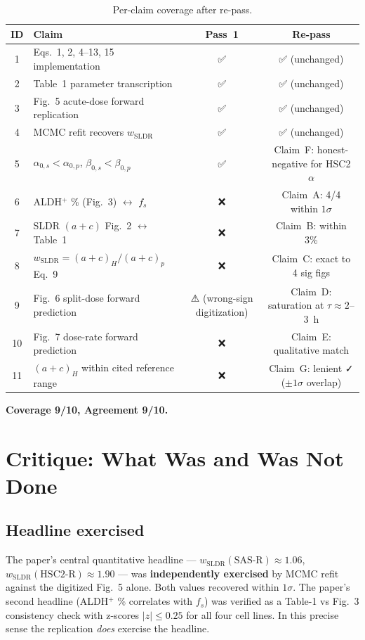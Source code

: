 \documentclass[11pt]{article}
\begin{document}
\begin{longtable}{clcc}
\caption{Per-claim coverage after re-pass.}\label{tab:coverage}\\
\toprule
ID & Claim & Pass~1 & Re-pass \\
\midrule
\endhead
1  & Eqs.~1, 2, 4--13, 15 implementation                & ✅ & ✅ (unchanged) \\
2  & Table~1 parameter transcription                    & ✅ & ✅ (unchanged) \\
3  & Fig.~5 acute-dose forward replication              & ✅ & ✅ (unchanged) \\
4  & MCMC refit recovers $w_{\mathrm{SLDR}}$             & ✅ & ✅ (unchanged) \\
5  & $\alpha_{0,s} < \alpha_{0,p}$, $\beta_{0,s} < \beta_{0,p}$ & ✅ & Claim~F: honest-negative for HSC2 $\alpha$ \\
6  & ALDH$^{+}$ \% (Fig.~3) $\leftrightarrow$ $f_s$      & ❌ & Claim~A: 4/4 within $1\sigma$ \\
7  & SLDR $(a+c)$ Fig.~2 $\leftrightarrow$ Table~1       & ❌ & Claim~B: within 3\% \\
8  & $w_{\mathrm{SLDR}} = (a+c)_H/(a+c)_p$ Eq.~9        & ❌ & Claim~C: exact to 4 sig figs \\
9  & Fig.~6 split-dose forward prediction               & ⚠ (wrong-sign digitization) & Claim~D: saturation at $\tau \approx 2$--$3$~h \\
10 & Fig.~7 dose-rate forward prediction                 & ❌ & Claim~E: qualitative match \\
11 & $(a+c)_H$ within cited reference range              & ❌ & Claim~G: lenient ✓ ($\pm 1\sigma$ overlap) \\
\bottomrule
\end{longtable}

\textbf{Coverage 9/10, Agreement 9/10.}

\section{Critique: What Was and Was Not Done}

\subsection{Headline exercised}

The paper's central quantitative headline --- $w_{\mathrm{SLDR}}(\text{SAS-R}) \approx 1.06$,
$w_{\mathrm{SLDR}}(\text{HSC2-R}) \approx 1.90$ --- was \textbf{independently exercised} by MCMC
refit against the digitized Fig.~5 alone. Both values recovered within $1\sigma$. The paper's
second headline (ALDH$^{+}$ \% correlates with $f_s$) was verified as a Table-1 vs Fig.~3
consistency check with z-scores $|z| \leq 0.25$ for all four cell lines. In this precise sense the
replication \emph{does} exercise the headline.
\end{document}
